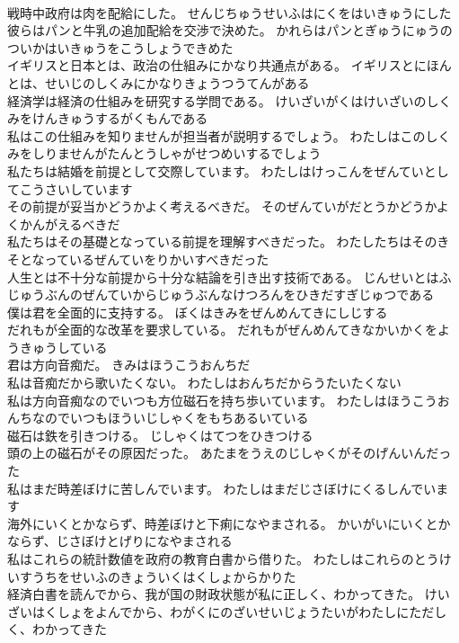 \documentclass[8pt]{extreport}
\begin{document}
\begin{CJK}{UTF8}{min}
\\	戦時中政府は肉を配給にした。	せんじちゅうせいふはにくをはいきゅうにした 
\\	彼らはパンと牛乳の追加配給を交渉で決めた。	かれらはパンとぎゅうにゅうのついかはいきゅうをこうしょうできめた 
\\	イギリスと日本とは、政治の仕組みにかなり共通点がある。	イギリスとにほんとは、せいじのしくみにかなりきょうつうてんがある 
\\	経済学は経済の仕組みを研究する学問である。	けいざいがくはけいざいのしくみをけんきゅうするがくもんである 
\\	私はこの仕組みを知りませんが担当者が説明するでしょう。	わたしはこのしくみをしりませんがたんとうしゃがせつめいするでしょう 
\\	私たちは結婚を前提として交際しています。	わたしはけっこんをぜんていとしてこうさいしています 
\\	その前提が妥当かどうかよく考えるべきだ。	そのぜんていがだとうかどうかよくかんがえるべきだ 
\\	私たちはその基礎となっている前提を理解すべきだった。	わたしたちはそのきそとなっているぜんていをりかいすべきだった 
\\	人生とは不十分な前提から十分な結論を引き出す技術である。	じんせいとはふじゅうぶんのぜんていからじゅうぶんなけつろんをひきだすぎじゅつである 
\\	僕は君を全面的に支持する。	ぼくはきみをぜんめんてきにしじする 
\\	だれもが全面的な改革を要求している。	だれもがぜんめんてきなかいかくをようきゅうしている 
\\	君は方向音痴だ。	きみはほうこうおんちだ 
\\	私は音痴だから歌いたくない。	わたしはおんちだからうたいたくない 
\\	私は方向音痴なのでいつも方位磁石を持ち歩いています。	わたしはほうこうおんちなのでいつもほういじしゃくをもちあるいている 
\\	磁石は鉄を引きつける。	じしゃくはてつをひきつける 
\\	頭の上の磁石がその原因だった。	あたまをうえのじしゃくがそのげんいんだった 
\\	私はまだ時差ぼけに苦しんでいます。	わたしはまだじさぼけにくるしんでいます 
\\	海外にいくとかならず、時差ぼけと下痢になやまされる。	かいがいにいくとかならず、じさぼけとげりになやまされる 
\\	私はこれらの統計数値を政府の教育白書から借りた。	わたしはこれらのとうけいすうちをせいふのきょういくはくしょからかりた 
\\	経済白書を読んでから、我が国の財政状態が私に正しく、わかってきた。	けいざいはくしょをよんでから、わがくにのざいせいじょうたいがわたしにただしく、わかってきた 

\end{CJK}
\end{document}
